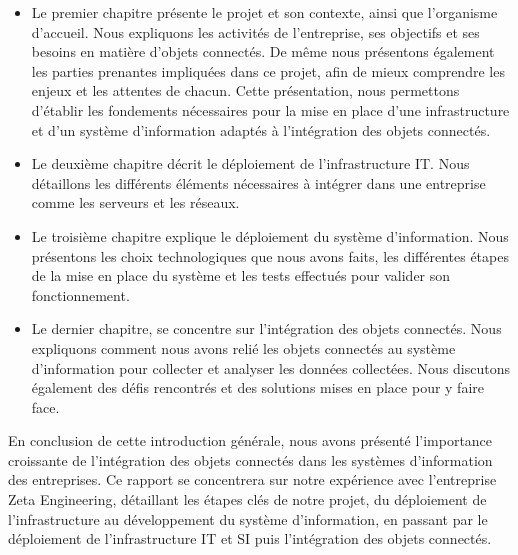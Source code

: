 {\begin{itemize}
  \item Le premier chapitre présente le projet et son contexte, ainsi que l'organisme d'accueil. Nous expliquons les activités de l'entreprise, ses objectifs et ses besoins en matière d'objets connectés. De même nous présentons également les parties prenantes impliquées dans ce projet, afin de mieux comprendre les enjeux et les attentes de chacun. Cette présentation, nous permettons d'établir les fondements nécessaires pour la mise en place d'une infrastructure et d'un système d'information adaptés à l'intégration des objets connectés. \\
  \item Le deuxième chapitre décrit le déploiement de l'infrastructure IT. Nous détaillons les différents éléments nécessaires à intégrer dans une entreprise comme les serveurs et les réseaux. \\
  \item Le troisième chapitre explique le déploiement du système d'information. Nous présentons les choix technologiques que nous avons faits, les différentes étapes de la mise en place du système et les tests effectués pour valider son fonctionnement. \\
  \item Le dernier chapitre, se concentre sur l'intégration des objets connectés. Nous expliquons comment nous avons relié les objets connectés au système d'information pour collecter et analyser les données collectées. Nous discutons également des défis rencontrés et des solutions mises en place pour y faire face. \\
\end{itemize}

En conclusion de cette introduction générale, nous avons présenté l'importance croissante de l'intégration des objets connectés dans les systèmes d’information des entreprises. Ce rapport se concentrera sur notre expérience avec l'entreprise Zeta Engineering, détaillant les étapes clés de notre projet, du déploiement de l'infrastructure au développement du système d'information, en passant par le déploiement de l'infrastructure IT et SI puis l'intégration  des objets connectés.



}